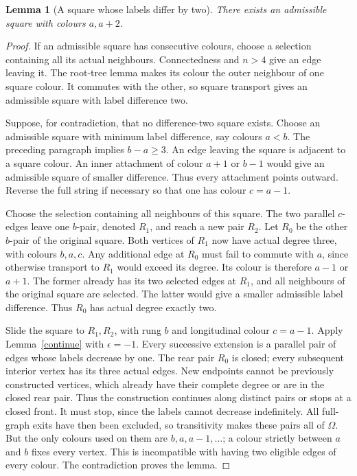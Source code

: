 \documentclass[11pt,a4paper]{article}
\newtheorem{lemma}[theorem]{Lemma}
\begin{document}
\begin{lemma}[A square whose labels differ by two]\label{gap}
There exists an admissible square with colours $a,a+2$.
\end{lemma}
\begin{proof}
If an admissible square has consecutive colours, choose a
selection containing all its actual neighbours. Connectedness
and $n>4$ give an edge leaving it. The root-tree lemma makes
its colour the outer neighbour of one square colour. It
commutes with the other, so square transport gives an
admissible square with label difference two.

Suppose, for contradiction, that no difference-two square
exists. Choose an admissible square with minimum label
difference, say colours $a<b$. The preceding paragraph
implies $b-a\ge3$. An edge leaving the square is adjacent
to a square colour. An inner attachment of colour $a+1$
or $b-1$ would give an admissible square of smaller difference.
Thus every attachment points outward. Reverse the full string
if necessary so that one has colour $c=a-1$.

Choose the selection containing all neighbours of this square.
The two parallel $c$-edges leave one $b$-pair, denoted $R_1$,
and reach a new pair $R_2$. Let $R_0$ be the other $b$-pair
of the original square. Both vertices of $R_1$ now have
actual degree three, with colours $b,a,c$. Any additional
edge at $R_0$ must fail to commute with $a$, since otherwise
transport to $R_1$ would exceed its degree. Its colour is
therefore $a-1$ or $a+1$. The former already has its two
selected edges at $R_1$, and all neighbours of the original
square are selected. The latter would give a smaller
admissible label difference. Thus $R_0$ has actual degree
exactly two.

Slide the square to $R_1,R_2$, with rung $b$ and longitudinal
colour $c=a-1$. Apply Lemma~\ref{continue} with
$\epsilon=-1$. Every successive extension is a parallel
pair of edges whose labels decrease by one. The rear pair
$R_0$ is closed; every subsequent interior vertex has its
three actual edges. New endpoints cannot be previously
constructed vertices, which already have their complete
degree or are in the closed rear pair. Thus the construction
continues along distinct pairs or stops at a closed front.
It must stop, since the labels cannot decrease indefinitely.
All full-graph exits have then been excluded, so transitivity
makes these pairs all of $\Omega$. But the only colours used
on them are $b,a,a-1,\ldots$; a colour strictly between $a$
and $b$ fixes every vertex. This is incompatible with having
two eligible edges of every colour. The contradiction proves
the lemma.
\end{proof}
\end{document}
